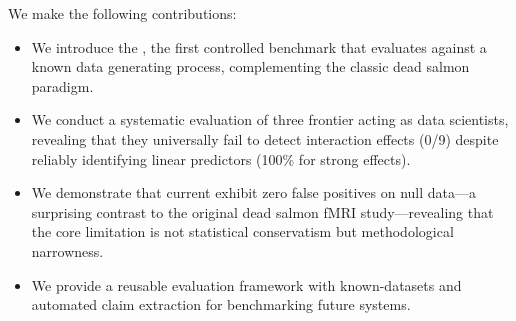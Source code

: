 We make the following contributions:
\begin{itemize}[leftmargin=*,itemsep=0pt,topsep=0pt]
    \item We introduce the \livesalmon, the first controlled benchmark that evaluates \aiscientists against a known data generating process, complementing the classic dead salmon paradigm.
    \item We conduct a systematic evaluation of three frontier \llms acting as data scientists, revealing that they universally fail to detect interaction effects (0/9) despite reliably identifying linear predictors (100\% for strong effects).
    \item We demonstrate that current \aiscientists exhibit zero false positives on null data---a surprising contrast to the original dead salmon fMRI study---revealing that the core limitation is not statistical conservatism but methodological narrowness.
    \item We provide a reusable evaluation framework with known-\dgp datasets and automated claim extraction for benchmarking future \aiscientist systems.
\end{itemize}
